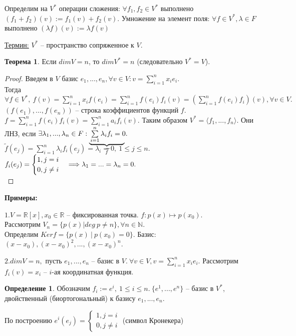 \documentclass[a4paper, 12pt]{article}
\newcommand\undermat[2]{\makebox[0pt][l]{$\smash{\underbrace
{\phantom{\begin{matrix}#2\end{matrix}}}_{\text{$#1$}}}$}#2}
\theoremstyle{definition}
\newtheorem*{definition}{Определение}
\newtheorem*{theorem}{Теорема}
\begin{document}
    Определим на $V^*$ операции сложения: $\forall f_1, f_2 \in V^*$
    выполнено $(f_1 + f_2)(v) := f_1(v) + f_2(v)$. Умножение на
    элемент поля: $\forall f \in V^*, \lambda \in F$ выполнено
    $(\lambda f)(v) := \lambda f(v)$

    \underline{Термин:} $V^*$ -- пространство сопряженное к $V$.
    \begin{theorem}
        Если $dimV = n$, то $dimV^* = n$ (следовательно $V^* = V$).
    \end{theorem}
    \begin{proof}
        Введем в $V$ базис $e_1,..., e_n, \forall v \in V:
        v = \sum\limits_{i=1}^nx_ie_i.$\\ Тогда $\forall f
        \in V^*,\ f(v) = \sum\limits_{i=1}^nx_if(e_i) =
        \sum\limits_{i=1}^nf(e_i)f_i(v) = (\sum\limits_{i=1}^n
        f(e_i)f_i)(v),\forall v\in V.$
        $(f(e_1),..., f(e_n))$ -- строка коэффициентов функций $f$.
        $f = \sum\limits_{i=1}^nf(e_i)f_i(v) = \sum\limits_{i=1}^n
        a_if_i(v).$ Таким образом $V^* = \langle f_1,..., f_n \rangle$.
        Они ЛНЗ, если $\exists \lambda_1,..., \lambda_n \in F:
        \undermat{\widetilde{f}}{\sum\limits_{i=1}^n\lambda_if_i = 0}.$
        $\widetilde{f}(e_j) = \sum\limits_{i=1}^n\lambda_if_i(e_j)
         = \lambda_i = 0,\ 1 \leq j\leq n$.\ 
        $f_i(e_j) = \begin{cases}
            1, j = i\\0, j \neq i
        \end{cases} \Longrightarrow\\\\\\ \lambda_1=...=\lambda_n=0.$\\
    \end{proof}
    \newpage
    \textbf{Примеры:}

    $1. V = \mathbb{R}[x], x_0 \in \mathbb{R}$ -- фиксированная
    точка. $f: p(x) \mapsto p(x_0).$\\
    Рассмотрим $V_n = \{p(x)|deg\ p \neq n\}, \forall n \in \mathbb{N}.$
    \\Определим $Ker f = \{p(x)\ |\ p(x_0) = 0\}$. Базис:
    $(x - x_0), (x-x_0)^2,...,(x-x_0)^n$.

    $2. dimV = n, \text{ пусть } e_1,..., e_n$ -- базис в $V.\
    \forall v \in V, v = \sum\limits_{i=1}^nx_ie_i$.
    Рассмотрим $f_i(v) = x_i$ -- $i$-ая координатная функция.
    \begin{definition}
        Обозначим $f_i := e^i,\ 1 \leq i \leq n.\ \{e^1,...,e^n\}$
        -- базис в $V^*$, двойственный (биортогональный) к базису
        $e_1,..., e_n$.
    \end{definition}
    По построению $e^i(e_j) =
    \begin{cases}1, j = i\\0, j \neq i\end{cases}$
    (символ Кронекера)
\end{document}
